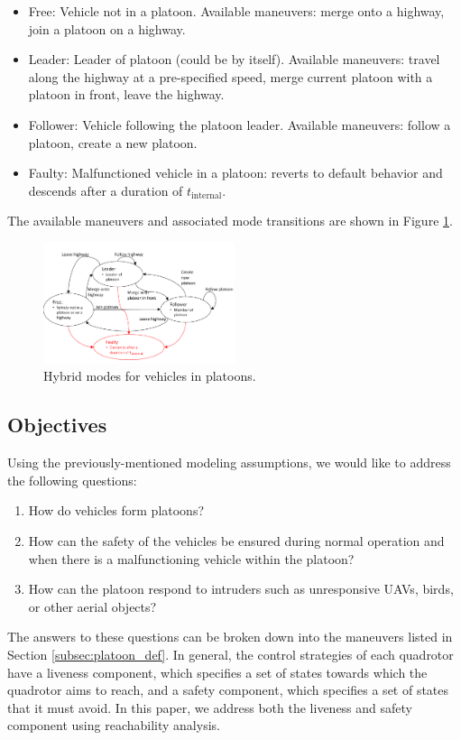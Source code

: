 \begin{itemize}
\item Free: Vehicle not in a platoon. Available maneuvers: merge onto a highway, join a platoon on a highway.
\item Leader: Leader of platoon (could be by itself). Available maneuvers: travel along the highway at a pre-specified speed, merge current platoon with a platoon in front, leave the highway.
\item Follower: Vehicle following the platoon leader. Available maneuvers: follow a platoon, create a new platoon.
\item Faulty: Malfunctioned vehicle in a platoon: reverts to default behavior and descends after a duration of $t_\text{internal}$.
\end{itemize}

The available maneuvers and associated mode transitions are shown in Figure \ref{fig:vehicleModes}.

\begin{figure}
	\centering
	\includegraphics[width=0.5\textwidth]{"fig/vehicleModes"}
	\caption{Hybrid modes for vehicles in platoons.}
	\label{fig:vehicleModes}
\end{figure}

\subsection{Objectives}
Using the previously-mentioned modeling assumptions, we would like to address the following questions:

\begin{enumerate}
\item How do vehicles form platoons?
\item How can the safety of the vehicles be ensured during normal operation and when there is a malfunctioning vehicle within the platoon?
\item How can the platoon respond to intruders such as unresponsive UAVs, birds, or other aerial objects?
\end{enumerate}

The answers to these questions can be broken down into the maneuvers listed in Section \ref{subsec:platoon_def}. In general, the control strategies of each quadrotor have a liveness component, which specifies a set of states towards which the quadrotor aims to reach, and a safety component, which specifies a set of states that it must avoid. In this paper, we address both the liveness and safety component using reachability analysis.
